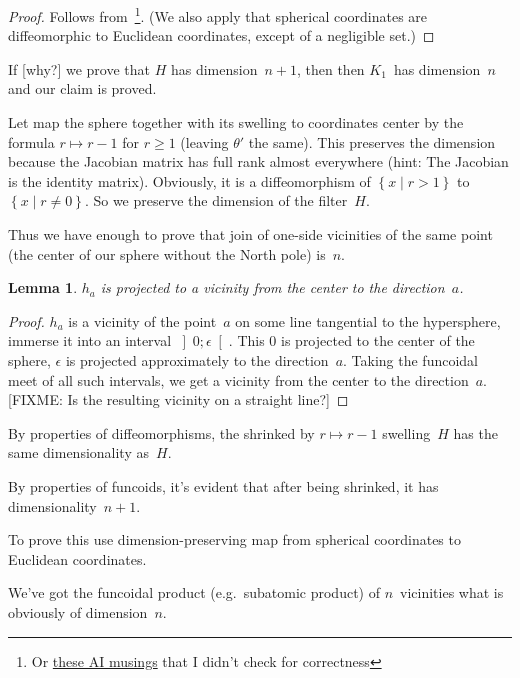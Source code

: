 \documentclass{amsart}
\newcommand{\setcond}[2]{\left\{#1\mid#2\right\}}
\newenvironment{del}{\color{gray}}{}
\newtheorem{lem}{Lemma}
\begin{document}
\begin{proof}
Follows from~\cite{189275}\footnote{Or \href{https://grok.com/share/bGVnYWN5_2e0aef8b-4309-420f-815c-a09d76ae97c1}{these AI musings}
that I didn't check for correctness}.
(We also apply that spherical coordinates are diffeomorphic to Euclidean coordinates, except of a negligible set.)
\end{proof}

If [why?] we prove that $H$ has dimension~$n+1$, then then $K_1$~has dimension~$n$ and our claim is proved.

Let map the sphere together with its swelling to coordinates center by the formula $r\mapsto r-1$ for $r\geq 1$ (leaving $\theta'$ the same).
This preserves the dimension because the Jacobian matrix has full rank almost everywhere (hint: The Jacobian is the identity matrix).
Obviously, it is a diffeomorphism of $\setcond{x}{r>1}$ to $\setcond{x}{r\ne 0}$. So we preserve the dimension of the filter~$H$.

Thus we have enough to prove that join of one-si\-de vicinities of the same point (the center of our sphere without the North pole) is~$n$.

\begin{lem}
$h_a$ is projected to a vicinity from the center to the direction~$a$.
\end{lem}

\begin{proof}
$h_a$ is a vicinity of the point~$a$ on some line tangential to the hypersphere, immerse it into an interval $\left]0;\epsilon\right[$. This $0$ is projected to the center of the sphere, $\epsilon$ is projected approximately to the direction~$a$. Taking the funcoidal meet of all such intervals, we get a vicinity from the center to the direction~$a$. [FIXME: Is the resulting vicinity on a straight line?]
\end{proof}

By properties of diffeomorphisms, the shrinked by $r\mapsto r-1$ swelling~$H$ has the same dimensionality as~$H$.

By properties of funcoids, it's evident that after being shrinked, it has dimensionality~$n+1$.

\begin{del}
To prove this use di\-men\-si\-on-pre\-ser\-ving map from spherical coordinates to Euclidean coordinates.

We've got the funcoidal product (e.g.\ subatomic product) of $n$\ vicinities what is obviously of dimension~$n$.
\end{del}



\end{document}
